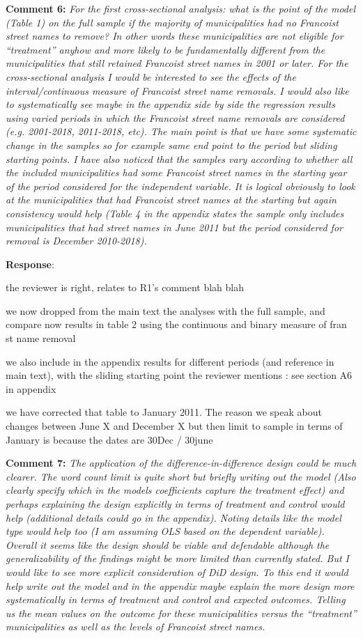 \documentclass[12pt, a4paper, notitlepage]{article}
\begin{document}
\textbf{Comment 6:} \textit{For the first cross-sectional analysis: what is the point of the model (Table 1) on the full sample if the majority of municipalities had no Francoist street names to remove? In other words these municipalities are not eligible for “treatment” anyhow and more likely to be fundamentally different from the municipalities that still retained Francoist street names in 2001 or later. For the cross-sectional analysis I would be interested to see the effects of the interval/continuous measure of Francoist street name removals. I would also like to systematically see maybe in the appendix side by side the regression results using varied periods in which the Francoist street name removals are considered (e.g. 2001-2018, 2011-2018, etc). The main point is that we have some systematic change in the samples so for example same end point to the period but sliding starting points. I have also noticed that the samples vary according to whether all the included municipalities had some Francoist street names in the starting year of the period considered for the independent variable. It is logical obviously to look at the municipalities that had Francoist street names at the starting but again consistency would help (Table 4 in the appendix states the sample only includes municipalities that had street names in June 2011 but the period considered for removal is December 2010-2018).}

\textbf{Response}: {\color{red}{pending}}

the reviewer is right, relates to R1's comment blah blah

we now dropped from the main text the analyses with the full sample, and compare now results in table 2 using the continuous and binary measure of fran st name removal

we also include in the appendix results for different periods (and reference in main text), with the sliding starting point the reviewer mentions : see section A6 in appendix

we have corrected that table to January 2011. The reason we speak about changes between June X and December X but then limit to sample in terms of January is because the dates are 30Dec / 30june


\textbf{Comment 7:} \textit{The application of the difference-in-difference design could be much clearer. The word count limit is quite short but briefly writing out the model (Also clearly specify which in the models coefficients capture the treatment effect) and perhaps explaining the design explicitly in terms of treatment and control would help (additional details could go in the appendix). Noting details like the model type would help too (I am assuming OLS based on the dependent variable). Overall it seems like the design should be viable and defendable although the generalizability of the findings might be more limited than currently stated. But I would like to see more explicit consideration of DiD design. To this end it would help write out the model and in the appendix maybe explain the more design more systematically in terms of treatment and control and expected outcomes. Telling us the mean values on the outcome for these municipalities versus the “treatment” municipalities as well as the levels of Francoist street names.}
\end{document}
